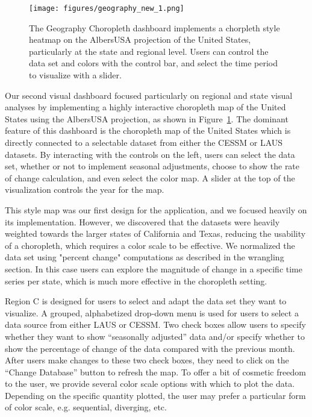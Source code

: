\documentclass[11pt,letterpaper]{article}
\begin{document}
\begin{figure}[!ht]
    \centering
    \texttt{[image: figures/geography\_new\_1.png]}
    \caption{The Geography Choropleth dashboard implements a chorpleth style heatmap on the AlbersUSA projection of the United States, particularly at the state and regional level. Users can control the data set and colors with the control bar, and select the time period to visualize with a slider.}
    \label{fig:Geography}
\end{figure}

Our second visual dashboard focused particularly on regional and state visual analyses by implementing a highly interactive choropleth map of the United States using the AlbersUSA projection, as shown in Figure~\ref{fig:Geography}. The dominant feature of this dashboard is the choropleth map of the United States which is directly connected to a selectable dataset from either the CESSM or LAUS datasets. By interacting with the controls on the left, users can select the data set, whether or not to implement seasonal adjustments, choose to show the rate of change calculation, and even select the color map. A slider at the top of the visualization controls the year for the map.

This style map was our first design for the application, and we focused heavily on its implementation. However, we discovered that the datasets were heavily weighted towards the larger states of California and Texas, reducing the usability of a choropleth, which requires a color scale to be effective. We normalized the data set using "percent change" computations as described in the wrangling section. In this case users can explore the magnitude of change in a specific time series per state, which is much more effective in the choropleth setting.

Region C is designed for users to select and adapt the data set they want to visualize. A grouped, alphabetized drop-down menu is used for users to select a data source from either LAUS or CESSM. Two check boxes allow users to specify whether they want to show ``seasonally adjusted'' data and/or specify whether to show the percentage of change of the data compared with the previous month. After users make changes to these two check boxes, they need to click on the ``Change Database'' button to refresh the map. To offer a bit of cosmetic freedom to the user, we provide several color scale options with which to plot the data. Depending on the specific quantity plotted, the user may prefer a particular form of color scale, e.g. sequential, diverging, etc.
\end{document}
